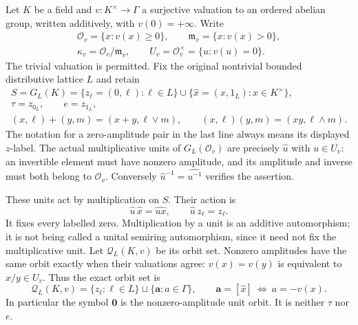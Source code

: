 Let $K$ be a field and
$v:K^\times\to\Gamma$ a surjective valuation to an ordered
abelian group, written additively, with $v(0)=+\infty$.
Write
\begin{equation}\tag{FCQ1}
\begin{gathered}
\mathcal O_v=\{x:v(x)\ge0\},\qquad
\mathfrak m_v=\{x:v(x)>0\},\\
\kappa_v=\mathcal O_v/\mathfrak m_v,\qquad
U_v=\mathcal O_v^\times=\{u:v(u)=0\}.
\end{gathered}
\end{equation}
The trivial valuation is permitted. Fix the original nontrivial
bounded distributive lattice $L$ and retain
\begin{equation}\tag{FCQ2}
\begin{gathered}
S=G_L(K)=\{z_\ell=(0,\ell):\ell\in L\}
 \cup\{\widehat x=(x,1_L):x\in K^\times\},\\
\tau=z_{0_L},\qquad e=z_{1_L},\\
(x,\ell)+(y,m)=(x+y,\ell\vee m),\qquad
(x,\ell)(y,m)=(xy,\ell\wedge m).
\end{gathered}
\end{equation}
The notation for a zero-amplitude pair in the last line always
means its displayed $z$-label. The actual multiplicative units
of $G_L(\mathcal O_v)$ are precisely $\widehat u$ with
$u\in U_v$: an invertible element must have nonzero amplitude,
and its amplitude and inverse must both belong to $\mathcal O_v$.
Conversely $\widehat u^{-1}=\widehat{u^{-1}}$ verifies the assertion.

These units act by multiplication on $S$. Their action is
\begin{equation}\tag{FCQ3}
\widehat u\,\widehat x=\widehat{ux},\qquad
\widehat u\,z_\ell=z_\ell .
\end{equation}
It fixes every labelled zero. Multiplication by a unit is an
additive automorphism; it is not being called a unital semiring
automorphism, since it need not fix the multiplicative unit.
Let $\mathscr Q_L(K,v)$ be its orbit set. Nonzero amplitudes
have the same orbit exactly when their valuations agree:
$v(x)=v(y)$ is equivalent to $x/y\in U_v$.
Thus the exact orbit set is
\begin{equation}\tag{FCQ4}
\mathscr Q_L(K,v)=\{z_\ell:\ell\in L\}
 \sqcup\{\mathbf a:a\in\Gamma\},\qquad
\mathbf a=[\widehat x]\ \Longleftrightarrow\ a=-v(x).
\end{equation}
In particular the symbol $\mathbf0$ is the nonzero-amplitude
unit orbit. It is neither $\tau$ nor $e$.

